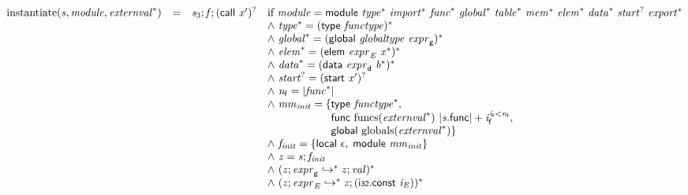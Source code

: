 $$
\begin{array}{@{}lcl@{}l@{}}
{\mathrm{instantiate}}({\mathit{s}}, {\mathit{module}}, {{\mathit{externval}}^\ast}) &=& {\mathit{s}}_{{3}} ; {\mathit{f}} ; {(\mathsf{call}~{\mathit{x}'})^?} &\quad
  \mbox{if}~{\mathit{module}} = \mathsf{module}~{{\mathit{type}}^\ast}~{{\mathit{import}}^\ast}~{{\mathit{func}}^\ast}~{{\mathit{global}}^\ast}~{{\mathit{table}}^\ast}~{{\mathit{mem}}^\ast}~{{\mathit{elem}}^\ast}~{{\mathit{data}}^\ast}~{{\mathit{start}}^?}~{{\mathit{export}}^\ast} \\
 &&&\quad {\land}~{{\mathit{type}}^\ast} = {(\mathsf{type}~{\mathit{functype}})^\ast} \\
 &&&\quad {\land}~{{\mathit{global}}^\ast} = {(\mathsf{global}~{\mathit{globaltype}}~{\mathit{expr}}_{{\mathsf{g}}})^\ast} \\
 &&&\quad {\land}~{{\mathit{elem}}^\ast} = {(\mathsf{elem}~{\mathit{expr}}_{{\mathit{E}}}~{{\mathit{x}}^\ast})^\ast} \\
 &&&\quad {\land}~{{\mathit{data}}^\ast} = {(\mathsf{data}~{\mathit{expr}}_{{\mathsf{d}}}~{{\mathit{b}}^\ast})^\ast} \\
 &&&\quad {\land}~{{\mathit{start}}^?} = {(\mathsf{start}~{\mathit{x}'})^?} \\
 &&&\quad {\land}~{\mathit{n}}_{{\mathsf{f}}} = {|{{\mathit{func}}^\ast}|} \\
 &&&\quad {\land}~{\mathit{mm}}_{{\mathit{init}}} = \{ \begin{array}[t]{@{}l@{}}
\mathsf{type}~{{\mathit{functype}}^\ast},\; \\
  \mathsf{func}~{\mathrm{funcs}}({{\mathit{externval}}^\ast})~{{|{\mathit{s}}.\mathsf{func}|} + {\mathit{i}}_{{\mathsf{f}}}^{{\mathit{i}}_{{\mathsf{f}}}<{\mathit{n}}_{{\mathsf{f}}}}},\; \\
  \mathsf{global}~{\mathrm{globals}}({{\mathit{externval}}^\ast}) \}\end{array} \\
 &&&\quad {\land}~{\mathit{f}}_{{\mathit{init}}} = \{ \begin{array}[t]{@{}l@{}}
\mathsf{local}~\epsilon,\; \mathsf{module}~{\mathit{mm}}_{{\mathit{init}}} \}\end{array} \\
 &&&\quad {\land}~{\mathit{z}} = {\mathit{s}} ; {\mathit{f}}_{{\mathit{init}}} \\
 &&&\quad {\land}~({\mathit{z}} ; {\mathit{expr}}_{{\mathsf{g}}} \hookrightarrow^\ast {\mathit{z}} ; {\mathit{val}})^\ast \\
 &&&\quad {\land}~({\mathit{z}} ; {\mathit{expr}}_{{\mathit{E}}} \hookrightarrow^\ast {\mathit{z}} ; (\mathsf{i{\scriptstyle32}}.\mathsf{const}~{\mathit{i}}_{{\mathit{E}}}))^\ast \\

\end{array}$$
